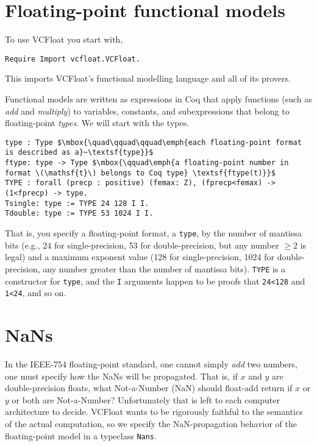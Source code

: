 \documentclass[article]{memoir}
\begin{document}
\chapter{Floating-point functional models}
\label{models}
To use VCFloat you start with,
\begin{lstlisting}
Require Import vcfloat.VCFloat.
\end{lstlisting}
This imports VCFloat's functional modelling language and all of its
provers.  

Functional models are written as expressions in Coq that apply
functions (such as \emph{add} and \emph{multiply}) to
variables, constants, and subexpressions that belong to floating-point
\emph{types}.  We will start with the types.

\begin{lstlisting}
type : Type $\mbox{\quad\qquad\qquad\emph{each floating-point format is described as a}~\textsf{type}}$
ftype: type -> Type $\mbox{\qquad\emph{a floating-point number in format \(\mathsf{t}\) belongs to Coq type} \textsf{ftype(t)}}$
TYPE : forall (precp : positive) (femax: Z), (fprecp<femax) -> (1<fprecp) -> type.
Tsingle: type := TYPE 24 128 I I.
Tdouble: type := TYPE 53 1024 I I.
\end{lstlisting}

That is, you specify a floating-point format, a \lstinline{type}, by
the number of mantissa bits (e.g., 24 for single-precision, 53 for
double-precision, but any number $\ge 2$ is legal) and a maximum
exponent value (128 for single-precision, 1024 for double-precision,
any number greater than the number of mantissa bits).
\lstinline{TYPE} is a constructor for \lstinline{type}, and the
\lstinline{I} arguments happen to be proofs that \lstinline{24<128}
and \lstinline{1<24}, and so on.

\chapter{NaNs}
\label{NaNs}
In the IEEE-754 floating-point standard, one cannot
simply \emph{add} two numbers, one must specify how the NaNs will
be propagated.  That is, if $x$ and $y$ are double-precision floats,
what Not-a-Number (NaN) should float-add return if $x$ or $y$ or both are
Not-a-Number?  Unfortunately that is left to each computer architecture 
to decide.  VCFloat wants to be rigorously faithful to the
semantics of the actual computation, so we specify the
NaN-propagation behavior of the floating-point model in a
typeclass \lstinline{Nans}.
\end{document}
